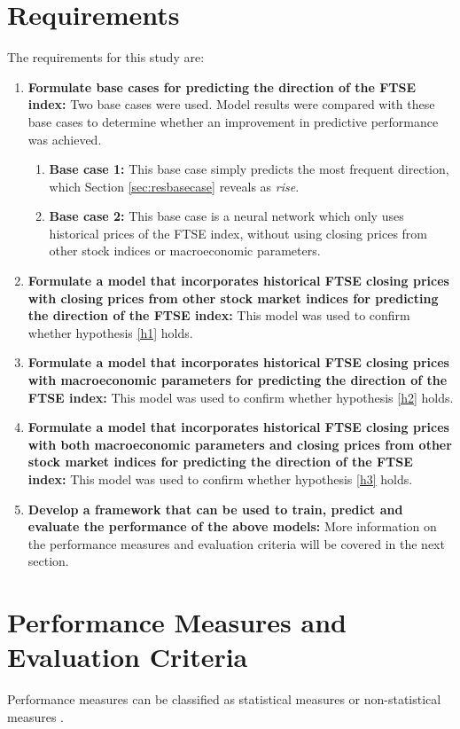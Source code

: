\documentclass{UoYCSproject}
\begin{document}
\section{Requirements}
\label{sec:requirements}
The requirements for this study are:

\begin{enumerate}
    \item \label{basecase} \textbf{Formulate base cases for predicting the direction of the FTSE index:} Two base cases were used. Model results were compared with these base cases to determine whether an improvement in predictive performance was achieved.  
    \begin{enumerate}
        \item \label{basecase1} \textbf{Base case 1:} This base case simply predicts the most frequent direction, which Section \ref{sec:resbasecase} reveals as \textit{rise}. 
        \item \label{basecase2} \textbf{Base case 2:} This base case is a neural network which only uses historical prices of the FTSE index, without using closing prices from other stock indices or macroeconomic parameters. 
    \end{enumerate}
    
    \item \textbf{Formulate a model that incorporates historical FTSE closing prices with closing prices from other stock market indices for predicting the direction of the FTSE index:} This model was used to confirm whether hypothesis \ref{h1} holds.
    \item \textbf{Formulate a model that incorporates historical FTSE closing prices with macroeconomic parameters for predicting the direction of the FTSE index:} This model was used to confirm whether hypothesis \ref{h2} holds.
    \item \textbf{Formulate a model that incorporates historical FTSE closing prices with both macroeconomic parameters and closing prices from other stock market indices for predicting the direction of the FTSE index:} This model was used to confirm whether hypothesis \ref{h3} holds.
    \item \label{framework} \textbf{Develop a framework that can be used to train, predict and evaluate the performance of the above models:} More information on the performance measures and evaluation criteria will be covered in the next section. 
\end{enumerate}

\section{Performance Measures and Evaluation Criteria}
Performance measures can be classified as statistical measures or non-statistical measures \cite{atsalakis2009surveying}.
\end{document}
